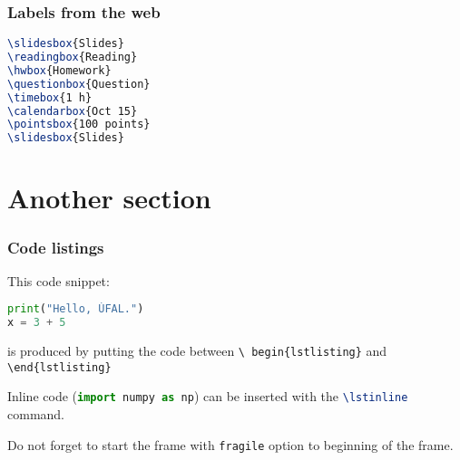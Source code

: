 \documentclass[handout,aspectratio=169]{beamer}
\begin{document}

\begin{frame}[fragile]
    \frametitle{Labels from the web}


    \begin{lstlisting}[language=TeX]
\slidesbox{Slides}
\readingbox{Reading}
\hwbox{Homework}
\questionbox{Question}
\timebox{1 h}
\calendarbox{Oct 15}
\pointsbox{100 points}
\slidesbox{Slides}
    \end{lstlisting}
\end{frame}

\section{Another section}

\begin{frame}[fragile]
    \frametitle{Code listings}

    This code snippet:
    \begin{lstlisting}[language=Python]
print("Hello, ÚFAL.")
x = 3 + 5
    \end{lstlisting}
%
    is produced by putting the code between {\tt  \textbackslash
    begin\{lstlisting\}} and {\tt \textbackslash end\{lstlisting\}}

    Inline code (\lstinline[language=Python]{import numpy as np}) can be
    inserted with the \lstinline[language=TeX]{\lstinline} command.

    Do not forget to start the frame with \lstinline[language=TeX]{fragile}
    option to beginning of the frame.

\end{frame}

\end{document}
